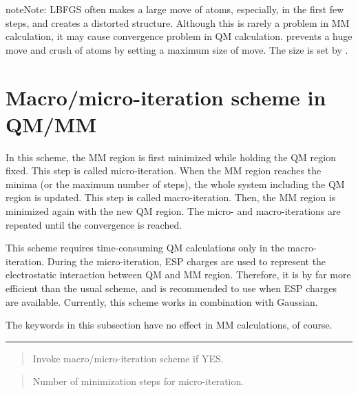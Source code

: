 \documentclass[a4paper,11pt,oneside,english]{sphinxmanual}
\begin{document}
\begin{sphinxadmonition}{note}{Note:}
LBFGS often makes a large move of atoms, especially, in the first
few steps, and creates a distorted structure. Although this is rarely a
problem in MM calculation, it may cause convergence problem in QM
calculation.  prevents a huge move and crush of atoms by
setting a maximum size of move. The size is set by .
\end{sphinxadmonition}


\section{Macro/micro-iteration scheme in QM/MM}
\label{\detokenize{07_Minimize:macro-micro-iteration-scheme-in-qm-mm}}
In this scheme, the MM region is first minimized while holding the QM
region fixed. This step is called micro-iteration.  When the MM region
reaches the minima (or the maximum number of steps), the whole system
including the QM region is updated. This step is called macro-iteration.
Then, the MM region is minimized again with the new QM region. The
micro- and macro-iterations are repeated until the convergence is
reached.

This scheme requires time-consuming QM calculations only in the
macro-iteration. During the micro-iteration, ESP charges are used to
represent the electrostatic interaction between QM and MM region.
Therefore, it is by far more efficient than the usual scheme, and is
recommended to use when ESP charges are available. Currently, this
scheme works in combination with Gaussian.

The keywords in this subsection have no effect in MM calculations,
of course.


\bigskip\hrule\bigskip


 
\begin{quote}


Invoke macro/micro-iteration scheme if YES.
\end{quote}

 
\begin{quote}


Number of minimization steps for micro-iteration.
\end{quote}
\end{document}
